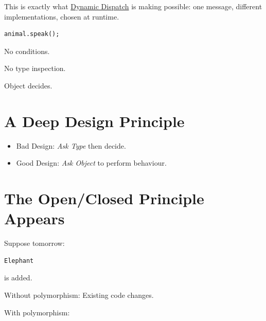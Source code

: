 \documentclass[11pt,a4paper]{book}
\begin{document}
This is exactly what \hyperref[sec:dynamic_dispatch_experiment]{Dynamic Dispatch} is making possible: one message, different implementations, chosen at runtime.

\begin{verbatim}
animal.speak();
\end{verbatim}


No conditions.

No type inspection.


Object decides.


\section{A Deep Design Principle}
\begin{itemize}
\item \textcolor{RosettaRed}{Bad Design}: \emph{Ask Type}
then decide.


\item \textcolor{RosettaSeaGreen}{Good Design}: \emph{Ask Object}
to perform behaviour.
\end{itemize}


\section{The Open/Closed Principle Appears}

Suppose tomorrow:

\begin{verbatim}
Elephant
\end{verbatim}

is added.


Without polymorphism: Existing code changes.


\textcolor{RosettaOrange}{With polymorphism}:
\end{document}

